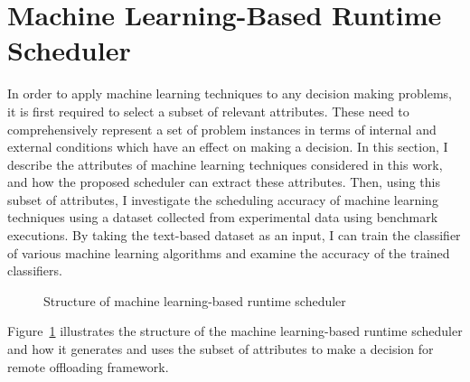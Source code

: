 \section{Machine Learning-Based Runtime Scheduler}
\label{scheduler:ml}
%
In order to apply machine learning techniques to any decision making
problems, it is first required to select a subset of relevant
attributes.
%
These need to comprehensively represent a set of problem instances in
terms of internal and external conditions which have an effect on making
a decision.
%
In this section, I describe the attributes of machine learning
techniques considered in this work, and how the proposed scheduler can
extract these attributes.
%
Then, using this subset of attributes, I investigate the scheduling
accuracy of machine learning techniques using a dataset collected from
experimental data using benchmark executions.
%
By taking the text-based dataset as an input, I can train the classifier
of various machine learning algorithms and examine the accuracy of the
trained classifiers.
%
\begin{figure}
\centering
{}
\caption{Structure of machine learning-based runtime scheduler}
\label{fig:scheduler}
\end{figure}
%
Figure~\ref{fig:scheduler} illustrates the structure of the machine
learning-based runtime scheduler and how it generates and uses the
subset of attributes to make a decision for remote offloading framework.
%
